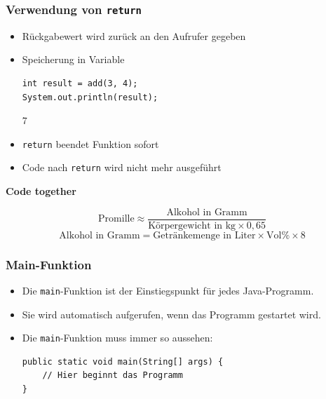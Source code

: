 \documentclass{../../presentation}
\begin{document}
\begin{frame}[fragile]
	\frametitle{Verwendung von \texttt{return}}

	\begin{itemize}
		\item\pause Rückgabewert wird zurück an den Aufrufer gegeben
		\item\pause Speicherung in Variable
		      \begin{verbatim}
int result = add(3, 4);
System.out.println(result); 
		\end{verbatim}
		      \begin{ausgabe}
			      7
		      \end{ausgabe}
		\item\pause \texttt{return} beendet Funktion sofort
		\item\pause Code nach \texttt{return} wird nicht mehr ausgeführt
	\end{itemize}
\end{frame}


\begin{frame}[plain]
	\centering
	{\Huge\bfseries{Code together}}
	\begin{block}{}
		\[
			\text{Promille} \approx \frac{\text{Alkohol in Gramm}}{\text{Körpergewicht in kg} \times 0{,}65}
		\]
		\[
			\text{Alkohol in Gramm} = \text{Getränkemenge in Liter} \times \text{Vol\%} \times 8
		\]
	\end{block}
\end{frame}

\begin{frame}[fragile]
	\frametitle{Main-Funktion}
	\begin{itemize}
		\item Die \texttt{main}-Funktion ist der Einstiegspunkt für jedes Java-Programm.
		\item Sie wird automatisch aufgerufen, wenn das Programm gestartet wird.
		\item Die \texttt{main}-Funktion muss immer so aussehen:
		      \begin{verbatim}
public static void main(String[] args) {
    // Hier beginnt das Programm
}
\end{verbatim}
	\end{itemize}
\end{frame}
\end{document}
